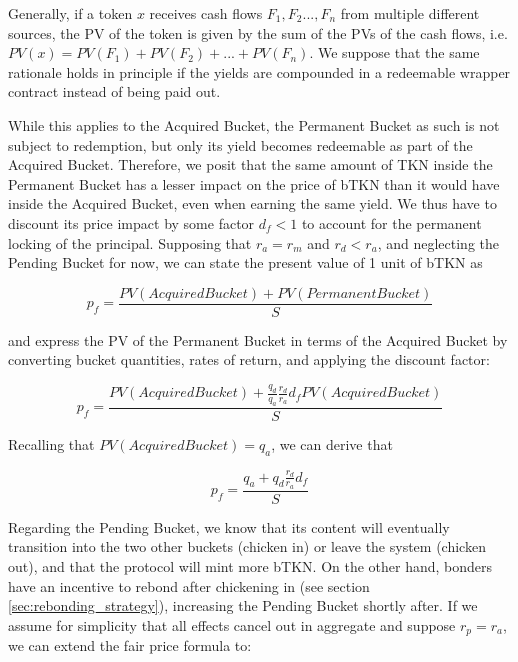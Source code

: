 \documentclass{article}
\begin{document}
Generally, if a token $x$ receives cash flows $F_1, F_2..., F_n$ from multiple different sources, the PV of the token is given by the sum of the PVs of the cash flows, i.e. $PV(x) = PV(F_1) + PV(F_2) + ... + PV(F_n)$. We suppose that the same rationale holds in principle if the yields are compounded in a redeemable wrapper contract instead of being paid out. 

While this applies to the Acquired Bucket, the Permanent Bucket as such is not subject to redemption, but only its yield becomes redeemable as part of the Acquired Bucket. Therefore, we posit that the same amount of TKN inside the Permanent Bucket has a lesser impact on the price of bTKN than it would have inside the Acquired Bucket, even when earning the same yield. We thus have to discount its price impact by some factor $d_f < 1$ to account for the permanent locking of the principal. Supposing that $r_a = r_m$ and $r_d < r_a$, and neglecting the Pending Bucket for now, we can state the present value of 1 unit of bTKN as

\begin{equation}
  \label{eq:naive-1}
    p_f = \frac{PV(AcquiredBucket) + PV(PermanentBucket)}{S}
\end{equation}

and express the PV of the Permanent Bucket in terms of the Acquired Bucket by converting bucket quantities, rates of return, and applying the discount factor:

\begin{equation}
  \label{eq:naive-2}
   p_f = \frac{PV(AcquiredBucket) + \frac{q_d}{q_a} \frac{r_d}{r_a} d_f PV(AcquiredBucket)}{S}
\end{equation}

Recalling that $PV(AcquiredBucket) = q_a$, we can derive that

\begin{equation}
  \label{eq:naive-3}
   p_f = \frac{q_a + q_d \frac{r_d}{r_a} d_f}{S}
\end{equation}

Regarding the Pending Bucket, we know that its content will eventually transition into the two other buckets (chicken in) or leave the system (chicken out), and that the protocol will mint more bTKN. On the other hand, bonders have an incentive to rebond after chickening in (see section \ref{sec:rebonding_strategy}), increasing the Pending Bucket shortly after. If we assume for simplicity that all effects cancel out in aggregate and suppose $r_p = r_a$, we can extend the fair price formula to:
\end{document}

